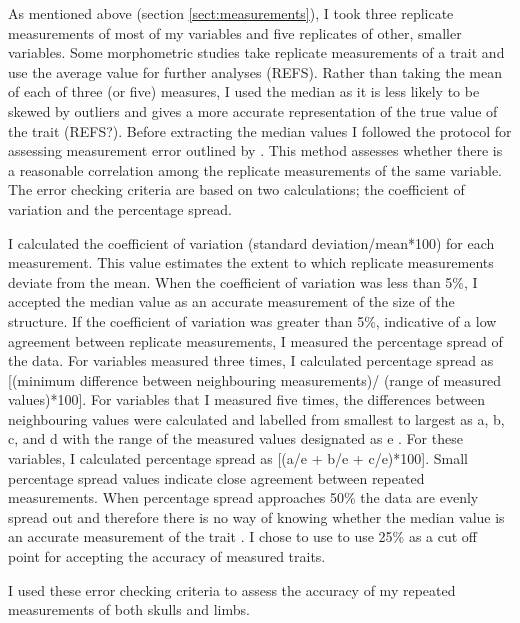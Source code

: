 	As mentioned above (section \ref{sect:measurements}), I took three replicate measurements of most of my variables and five replicates of other, smaller variables. 
	Some morphometric studies take replicate measurements of a trait and use the average value for further analyses (REFS). Rather than taking the mean of each of three (or five) measures, I used the median as it is less likely to be skewed by outliers and gives a more accurate representation of the true value of the trait (REFS?).
	Before extracting the median values I followed the protocol for assessing measurement error outlined by \citep{Cooper2009}. This method assesses whether there is a reasonable correlation among the replicate measurements of the same variable. The error checking criteria are based on two calculations; the coefficient of variation and the percentage spread.
	
	I calculated the coefficient of variation (standard deviation/mean*100) for each measurement. This value estimates the extent to which replicate measurements deviate from the mean. When the coefficient of variation was less than 5\%, I accepted the median value as an accurate measurement of the size of the structure. 
	If the coefficient of variation was greater than 5\%, indicative of a low agreement between replicate measurements, I measured the percentage spread of the data. For variables measured three times, I calculated percentage spread as [(minimum difference between neighbouring measurements)/ (range of measured values)*100].
	For variables that I measured five times, the differences between neighbouring values were calculated and labelled from smallest to largest as a, b, c, and d with the range of the measured values designated as e \citep{Cooper2009}. For these variables, I calculated percentage spread as [(a/e + b/e + c/e)*100]. 
	Small percentage spread values indicate close agreement between repeated measurements. When percentage spread approaches 50\% the data are evenly spread out and therefore there is no way of knowing whether the median value is an accurate measurement of the trait \citep{Cooper2009}. I chose to use to use 25\% as a cut off point for accepting the accuracy of measured traits.

	I used these error checking criteria to assess the accuracy of my repeated measurements of both skulls and limbs. 


